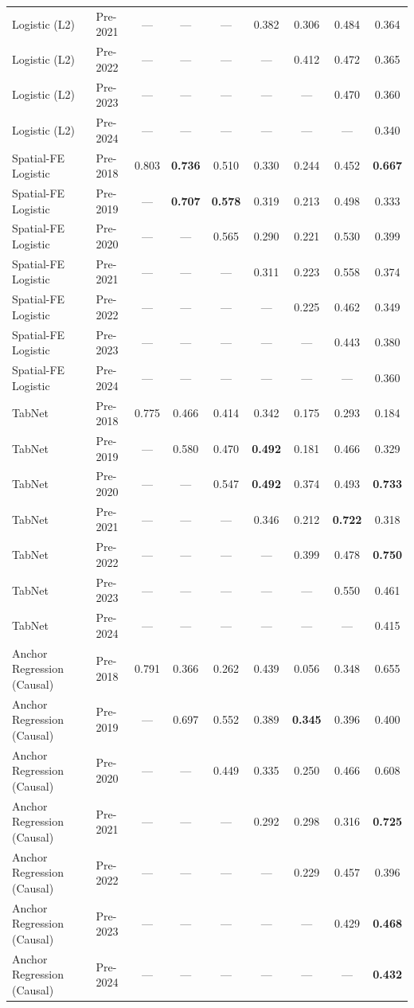 \begin{table}[htbp]
{\begin{tabular}{l lccccccc}
Logistic (L2) & Pre-2021 & --- & --- & --- & 0.382 & 0.306 & 0.484 & 0.364 \\
Logistic (L2) & Pre-2022 & --- & --- & --- & --- & 0.412 & 0.472 & 0.365 \\
Logistic (L2) & Pre-2023 & --- & --- & --- & --- & --- & 0.470 & 0.360 \\
Logistic (L2) & Pre-2024 & --- & --- & --- & --- & --- & --- & 0.340 \\
Spatial-FE Logistic & Pre-2018 & 0.803 & \textbf{0.736} & 0.510 & 0.330 & 0.244 & 0.452 & \textbf{0.667} \\
Spatial-FE Logistic & Pre-2019 & --- & \textbf{0.707} & \textbf{0.578} & 0.319 & 0.213 & 0.498 & 0.333 \\
Spatial-FE Logistic & Pre-2020 & --- & --- & 0.565 & 0.290 & 0.221 & 0.530 & 0.399 \\
Spatial-FE Logistic & Pre-2021 & --- & --- & --- & 0.311 & 0.223 & 0.558 & 0.374 \\
Spatial-FE Logistic & Pre-2022 & --- & --- & --- & --- & 0.225 & 0.462 & 0.349 \\
Spatial-FE Logistic & Pre-2023 & --- & --- & --- & --- & --- & 0.443 & 0.380 \\
Spatial-FE Logistic & Pre-2024 & --- & --- & --- & --- & --- & --- & 0.360 \\
TabNet & Pre-2018 & 0.775 & 0.466 & 0.414 & 0.342 & 0.175 & 0.293 & 0.184 \\
TabNet & Pre-2019 & --- & 0.580 & 0.470 & \textbf{0.492} & 0.181 & 0.466 & 0.329 \\
TabNet & Pre-2020 & --- & --- & 0.547 & \textbf{0.492} & 0.374 & 0.493 & \textbf{0.733} \\
TabNet & Pre-2021 & --- & --- & --- & 0.346 & 0.212 & \textbf{0.722} & 0.318 \\
TabNet & Pre-2022 & --- & --- & --- & --- & 0.399 & 0.478 & \textbf{0.750} \\
TabNet & Pre-2023 & --- & --- & --- & --- & --- & 0.550 & 0.461 \\
TabNet & Pre-2024 & --- & --- & --- & --- & --- & --- & 0.415 \\
Anchor Regression (Causal) & Pre-2018 & 0.791 & 0.366 & 0.262 & 0.439 & 0.056 & 0.348 & 0.655 \\
Anchor Regression (Causal) & Pre-2019 & --- & 0.697 & 0.552 & 0.389 & \textbf{0.345} & 0.396 & 0.400 \\
Anchor Regression (Causal) & Pre-2020 & --- & --- & 0.449 & 0.335 & 0.250 & 0.466 & 0.608 \\
Anchor Regression (Causal) & Pre-2021 & --- & --- & --- & 0.292 & 0.298 & 0.316 & \textbf{0.725} \\
Anchor Regression (Causal) & Pre-2022 & --- & --- & --- & --- & 0.229 & 0.457 & 0.396 \\
Anchor Regression (Causal) & Pre-2023 & --- & --- & --- & --- & --- & 0.429 & \textbf{0.468} \\
Anchor Regression (Causal) & Pre-2024 & --- & --- & --- & --- & --- & --- & \textbf{0.432} \\
\bottomrule
\end{tabular}%
}
\end{table}
